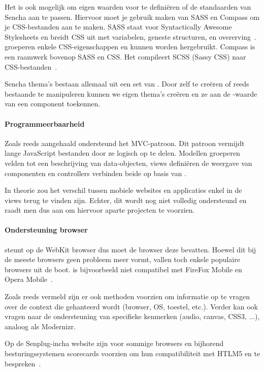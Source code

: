 Het is ook mogelijk om eigen waarden voor  te definiëren of de standaarden van Sencha aan te passen.  
Hiervoor moet je gebruik maken van SASS en Compass om je CSS-bestanden aan te maken.  
SASS staat voor Syntactically Awesome Stylesheets en breidt CSS uit met variabelen,  geneste structuren,  en overerving~\cite{Eppstein2013}.  
 groeperen enkele CSS-eigenschappen en kunnen worden hergebruikt.  
Compass is een raamwerk bovenop SASS en CSS.  
Het compileert SCSS (Sassy CSS) naar CSS-bestanden~\cite{Eppstein2013a}.        

Sencha thema's bestaan allemaal uit een set van .  
Door zelf  te creëren of reeds bestaande te manipuleren kunnen we eigen thema's creëren en ze aan de -waarde van een component toekennen.

\paragraph{Programmeerbaarheid}
\label{sec:sencha-programeerbaarheid}
Zoals reeds aangehaald ondersteund \st{} het MVC-patroon.  
Dit patroon vermijdt lange JavaScript bestanden door ze logisch op te delen.  
Modellen groeperen velden tot een beschrijving van data-objecten, views definiëren de weergave van componenten en controllers verbinden beide op basis van .

In theorie zou het verschil tussen mobiele websites en applicaties enkel in de views terug te vinden zijn.  
Echter,  dit wordt nog niet volledig ondersteund en raadt men dus aan om hiervoor aparte projecten te voorzien.

\paragraph{Ondersteuning browser}
\st{} steunt op de WebKit browser  dus moet de browser deze bevatten.  
Hoewel dit bij de meeste browsers geen probleem meer vormt, vallen toch enkele populaire browsers uit de boot.  
\st{} is bijvoorbeeld niet compatibel met FireFox Mobile en Opera Mobile~\cite{JohnEClark2012}.

Zoals reeds vermeld zijn er ook methoden voorzien om informatie op te vragen over de context die gehanteerd wordt (browser, OS, toestel, etc.).  
Verder kan \st{} ook vragen naar de ondersteuning van specifieke kenmerken (audio,  canvas,  CSS3, ...),  analoog als Modernizr.  

Op de Senplug-incha website zijn voor sommige browsers en bijhorend besturingssystemen scorecards voorzien om hun compatibiliteit met HTLM5 en \st{} te bespreken~\cite{Inc.}.


